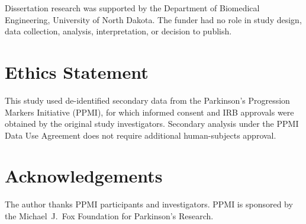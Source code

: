 Dissertation research was supported by the Department of Biomedical Engineering, University of North Dakota. The funder had no role in study design, data collection, analysis, interpretation, or decision to publish.

\section*{Ethics Statement}

This study used de-identified secondary data from the Parkinson's Progression Markers Initiative (PPMI), for which informed consent and IRB approvals were obtained by the original study investigators. Secondary analysis under the PPMI Data Use Agreement does not require additional human-subjects approval.

\section*{Acknowledgements}

The author thanks PPMI participants and investigators. PPMI is sponsored by the Michael~J.~Fox Foundation for Parkinson's Research.


